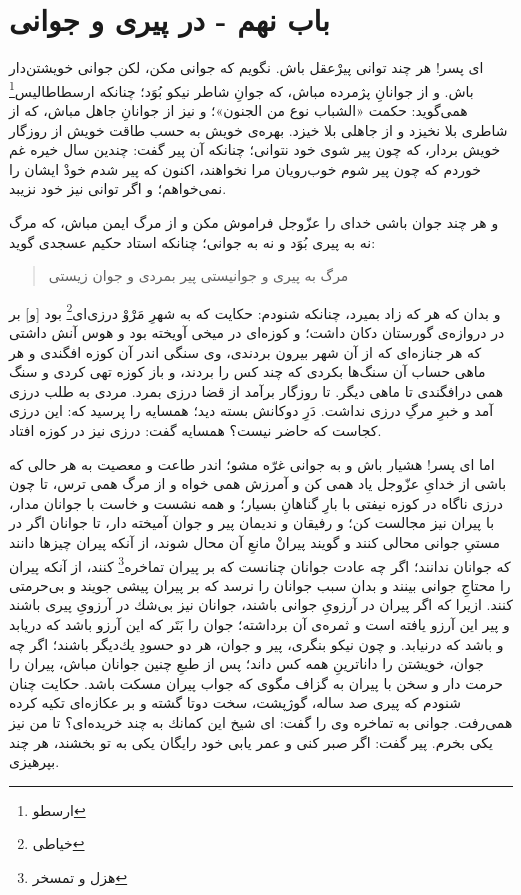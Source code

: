 \section*{ باب نهم - در پیری و جوانی}

اى پسر! هر چند توانى پير‌ْعقل باش. نگويم كه جوانى مكن، لكن جوانى خويشتن‌دار باش. و از جوانانِ پژمرده مباش، كه جوانِ شاطر نيكو بُوَد؛ چنانكه ارسطاطاليس\footnote{ارسطو} همى‌گويد: حكمت «الشباب نوع من الجنون»؛ و نيز از جوانانِ جاهل مباش، كه از شاطرى بلا نخيزد و از جاهلى بلا خيزد. بهره‌ی خويش به حسب طاقت خويش از روزگار خويش بردار، كه چون پير شوى خود نتوانى؛ چنانكه آن پير گفت: چندين سال خيره غم خوردم كه چون پير شوم خوب‌رويان مرا نخواهند، اكنون كه پير شدم خودْ ايشان را نمى‌خواهم؛ و اگر توانى نيز خود نزيبد.

و هر چند جوان باشى خداى را عزّوجل فراموش مكن و از مرگ ايمن مباش، كه مرگ نه به پيرى بُوَد و نه به جوانى؛ چنانكه استاد حكيم عسجدى گويد:

\begin{quote}
\centering
مرگ به پيرى و جوانيستى \quad \quad 
پير بمردى و جوان زيستی
\end{quote}

و بدان كه هر كه زاد بميرد، چنانكه شنودم: حكايت كه به شهرِ مَرْوْ درزى‌اى\footnote{خیاطی} بود [و] بر در دروازه‌ی گورستان دكان داشت؛ و كوزه‌اى در ميخى آويخته بود و هوس آنش داشتى كه هر جنازه‌اى كه از آن شهر بيرون بردندى، وى سنگى اندر آن كوزه افگندى و هر ماهى حساب آن سنگ‌ها بكردى كه چند كس را بردند، و باز كوزه تهى كردى و سنگ همى درافگندى تا ماهى ديگر. تا روزگار برآمد از قضا درزى بمرد. مردى به طلب درزى آمد و خبرِ مرگِ درزى نداشت. دَرِ دوكانش بسته ديد؛ همسايه را پرسيد كه: اين درزى كجاست كه حاضر نيست‌؟ همسايه گفت: درزى نيز در كوزه افتاد.

اما اى پسر! هشيار باش و به جوانى غرّه مشو؛ اندر طاعت و معصيت به هر حالى كه باشى از خداىِ عزّوجل ياد همى كن و آمرزش همى خواه و از مرگ همى ترس، تا چون درزى ناگاه در كوزه نيفتى با بارِ گناهانِ بسيار؛ و همه نشست و خاست با جوانان مدار، با پيران نيز مجالست كن؛ و رفيقان و نديمان پير و جوان آميخته دار، تا جوانان اگر در مستیِ جوانى محالى كنند و گويند پيرانْ مانعِ آن محال شوند، از آنكه پيران چيزها دانند كه جوانان ندانند؛ اگر چه عادت جوانان چنانست كه بر پيران تماخره\footnote{هزل و تمسخر} كنند، از آنكه پيران را محتاجِ جوانى بينند و بدان سبب جوانان را نرسد كه بر پيران پيشى جويند و بى‌حرمتى كنند. ازيرا كه اگر پيران در آرزوىِ جوانى باشند، جوانان نيز بى‌شك در آرزوىِ پيرى باشند و پير اين آرزو يافته است و ثمره‌ی آن برداشته؛ جوان را بَتَر كه اين آرزو باشد كه دريابد و باشد كه درنيابد. و چون نيكو بنگرى، پير و جوان، هر دو حسودِ يك‌ديگر باشند؛ اگر چه جوان، خويشتن را داناترينِ همه كس داند؛ پس از طبعِ چنين جوانان مباش، پيران را حرمت دار و سخن با پيران به گزاف مگوى كه جواب پيران مسكت باشد. حكايت چنان شنودم كه پيرى صد ساله، گوژپشت، سخت دوتا گشته و بر عكازه‌اى تكيه كرده همى‌رفت. جوانى به تماخره وى را گفت: اى شيخ اين كمانك به چند خريده‌اى‌؟ تا من نيز يكى بخرم. پير گفت: اگر صبر كنى و عمر يابى خود رايگان يكى به تو بخشند، هر چند بپرهيزى. 

